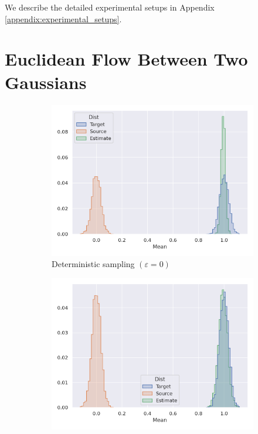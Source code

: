 We describe the detailed experimental setups in Appendix \ref{appendix:experimental_setups}.

\section{Euclidean Flow Between Two Gaussians} \label{sec:gaussian_flow}

\begin{figure}[h!]
    \centering
    \begin{subfigure}{0.47\linewidth}
        \centering
        \includegraphics[width=\linewidth]{figures/gaussian/0.png}
        \caption{Deterministic sampling $(\varepsilon = 0)$}
        \label{fig:gaussian_deterministic}
    \end{subfigure}
    \begin{subfigure}{0.47\linewidth}
        \centering
        \includegraphics[width=\linewidth]{figures/gaussian/0.05.png}

\end{subfigure}
\end{figure}
